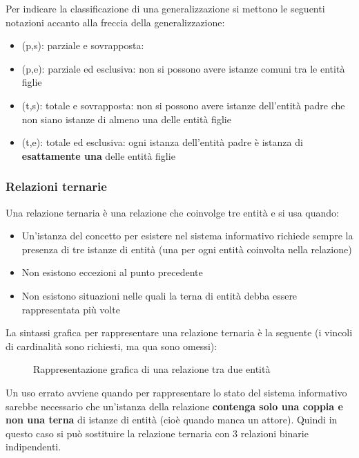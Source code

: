 \documentclass[a4paper,twoside]{article}
\begin{document}
\vspace{1em}
\noindent
Per indicare la classificazione di una generalizzazione si mettono le seguenti
notazioni accanto alla freccia della generalizzazione:
\begin{itemize}
  \item (p,s): parziale e sovrapposta: 
  \item (p,e): parziale ed esclusiva: non si possono avere istanze comuni tra le entità figlie
  \item (t,s): totale e sovrapposta: non si possono avere istanze dell'entità padre
    che non siano istanze di almeno una delle entità figlie
  \item (t,e): totale ed esclusiva: ogni istanza dell'entità padre è istanza
    di \textbf{esattamente una} delle entità figlie
\end{itemize}

\subsubsection{Relazioni ternarie}
Una relazione ternaria è una relazione che coinvolge tre entità e si usa quando:
\begin{itemize}
  \item Un'istanza del concetto per esistere nel sistema informativo richiede sempre
    la presenza di tre istanze di entità (una per ogni entità coinvolta nella relazione)

  \item Non esistono eccezioni al punto precedente
  \item Non esistono situazioni nelle quali la terna di entità debba essere rappresentata
    più volte
\end{itemize}
La sintassi grafica per rappresentare una relazione ternaria è la seguente (i vincoli
di cardinalità sono richiesti, ma qua sono omessi):

\begin{figure}[H]
  \centering
  \caption{Rappresentazione grafica di una relazione tra due entità}
\end{figure}
\noindent
Un uso errato avviene quando per rappresentare lo stato del sistema informativo
sarebbe necessario che un'istanza della relazione \textbf{contenga solo una
coppia e non una terna} di istanze di entità (cioè quando manca un attore).
Quindi in questo caso si può sostituire la relazione ternaria con 3 relazioni binarie
indipendenti.
\end{document}
